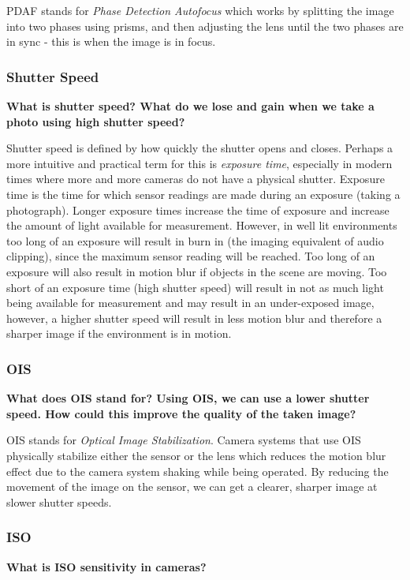 \documentclass[12pt, letterpaper]{article}
\begin{document}
PDAF stands for \textit{Phase Detection Autofocus} which works by splitting the image into two phases using prisms, and then adjusting the lens until the two phases are in sync - this is when the image is in focus.

\subsubsection{Shutter Speed}
\textbf{What is shutter speed? What do we lose and gain when we take a photo using high shutter speed?}

Shutter speed is defined by how quickly the shutter opens and closes. Perhaps a more intuitive and practical term for this is \textit{exposure time}, especially in modern times where more and more cameras do not have a physical shutter. Exposure time is the time for which sensor readings are made during an exposure (taking a photograph). Longer exposure times increase the time of exposure and increase the amount of light available for measurement. However, in well lit environments too long of an exposure will result in burn in (the imaging equivalent of audio clipping), since the maximum sensor reading will be reached. Too long of an exposure will also result in motion blur if objects in the scene are moving. Too short of an exposure time (high shutter speed) will result in not as much light being available for measurement and may result in an under-exposed image, however, a higher shutter speed will result in less motion blur and therefore a sharper image if the environment is in motion.

\subsubsection{OIS}
\textbf{What does OIS stand for? Using OIS, we can use a lower shutter speed. How could this improve the quality of
the taken image?}

OIS stands for \textit{Optical Image Stabilization}. Camera systems that use OIS physically stabilize either the sensor or the lens which reduces the motion blur effect due to the camera system shaking while being operated. By reducing the movement of the image on the sensor, we can get a clearer, sharper image at slower shutter speeds.

\subsubsection{ISO}
\textbf{What is ISO sensitivity in cameras?}
\end{document}
